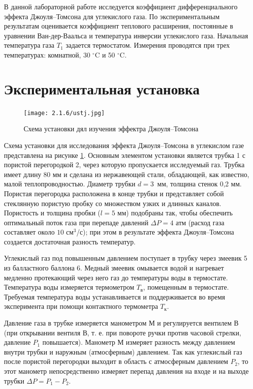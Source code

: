 \documentclass[a4paper,12pt]{article} %
\begin{document}
В данной лабораторной работе исследуется коэффициент дифференциального эффекта Джоуля–Томсона для углекислого газа. По экспериментальным результатам оценивается коэффициент теплового расширения, постоянные в уравнении Ван-дер-Ваальса и температура инверсии углекислого газа. Начальная температура газа $ T_1 $ задается термостатом. Измерения проводятся при трех температурах: комнатной, 30 $ ^\circ $C и 50 $ ^\circ $C.

\section{Экспериментальная установка}

\begin{figure}[H]
	\begin{center}
		\texttt{[image: 2.1.6/ustj.jpg]}
	\end{center}
	\caption{Схема установки дял изучения эффектра Джоуля--Томсона}
	\label{ust}
\end{figure}

Схема установки для исследования эффекта Джоуля–Томсона в углекислом газе представлена на рисунке \ref{ust}. Основным элементом установки является трубка 1 с пористой перегородкой 2, через которую пропускается исследуемый газ. Трубка имеет длину 80 мм и сделана из нержавеющей стали, обладающей, как известно, малой теплопроводностью. Диаметр трубки $ d = 3 $~мм, толщина стенок 0,2 мм. Пористая перегородка расположена в конце трубки и представляет собой стеклянную пористую пробку со множеством узких и длинных каналов. Пористость и толщина пробки ($ l = 5 $ мм) подобраны так, чтобы обеспечить оптимальный поток газа при перепаде давлений $ \Delta P = 4 $ атм (расход газа составляет около $ 10 $ см$ ^3 $/с); при этом в результате эффекта Джоуля–Томсона создается достаточная разность температур.

Углекислый газ под повышенным давлением поступает в трубку через змеевик 5 из балластного баллона 6. Медный змеевик омывается водой и нагревает медленно протекающий через него газ до температуры воды в термостате. Температура воды измеряется термометром $ T_\text{в} $, помещенным в термостате. Требуемая температура воды устанавливается и поддерживается во время эксперимента при помощи контактного термометра $ T_\text{к} $.

Давление газа в трубке измеряется манометром М и регулируется вентилем В (при открывании вентиля В, т. е. при повороте ручки против часовой стрелки, давление $ P_1 $ повышается). Манометр М измеряет разность между давлением внутри трубки и наружным (атмосферным) давлением. Так как углекислый газ после пористой перегородки выходит в область с атмосферным давлением $ P_2 $, то этот манометр непосредственно измеряет перепад давления на входе и на выходе трубки $ \Delta P = P_1 - P_2 $.
\end{document}
